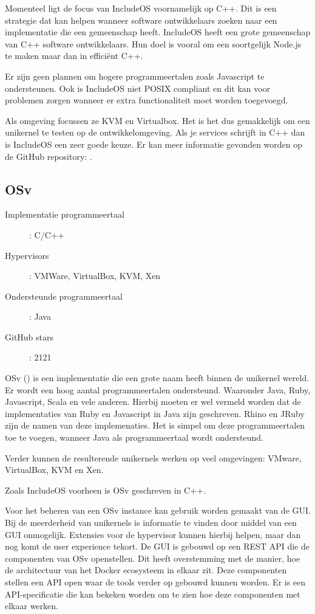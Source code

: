 Momenteel ligt de focus van IncludeOS voornamelijk op C++. Dit is een strategie dat kan helpen wanneer software ontwikkelaars zoeken naar een implementatie die een gemeenschap heeft. IncludeOS heeft een grote gemeenschap van C++ software ontwikkelaars. Hun doel is vooral om een soortgelijk Node.js te maken maar dan in efficiënt C++.

Er zijn geen plannen om hogere programmeertalen zoals Javascript te ondersteunen. Ook is IncludeOS niet POSIX compliant en dit kan voor problemen zorgen wanneer er extra functionaliteit moet worden toegevoegd.

Als omgeving focussen ze KVM en Virtualbox. Het is het dus gemakkelijk om een unikernel te testen op de ontwikkelomgeving. Als je services schrijft in C++ dan is IncludeOS een zeer goede keuze. Er kan meer informatie gevonden worden op de GitHub repository: \cite{oslo_and_akershus_university_college_hioa-cs/includeos_????}.

\subsection{OSv}

\begin{description}
  \item [Implementatie programmeertaal]: C/C++
  \item [Hypervisors]: VMWare, VirtualBox, KVM, Xen
  \item [Ondersteunde programmeertaal]: Java
  \item [GitHub stars]: 2121
\end{description}

OSv (\cite{cloudius-systems/osv_0000}) is een implementatie die een grote naam heeft binnen de unikernel wereld. Er wordt een hoog aantal programmeertalen ondersteund. Waaronder Java, Ruby, Javascript, Scala en vele anderen. Hierbij moeten er wel vermeld worden dat de implementaties van Ruby en Javascript in Java zijn geschreven. Rhino en JRuby zijn de namen van deze implemenaties. Het is simpel om deze programmeertalen toe te voegen, wanneer Java als programmeertaal wordt ondersteund.

Verder kunnen de resulterende unikernels werken op veel omgevingen: VMware, VirtualBox, KVM en Xen.

Zoals IncludeOS voorheen is OSv geschreven in C++.

Voor het beheren van een OSv instance kan gebruik worden gemaakt van de GUI. Bij de meerderheid van unikernels is informatie te vinden door middel van een GUI onmogelijk. Extensies voor de hypervisor kunnen hierbij helpen, maar dan nog komt de user experience tekort. De GUI is gebouwd op een REST API die de componenten van OSv openstellen. Dit heeft overstemming met de manier, hoe de architectuur van het Docker ecosysteem in elkaar zit. Deze componenten stellen een API open waar de tools verder op gebouwd kunnen worden. Er is een API-specificatie die kan bekeken worden om te zien hoe deze componenten met elkaar werken.

